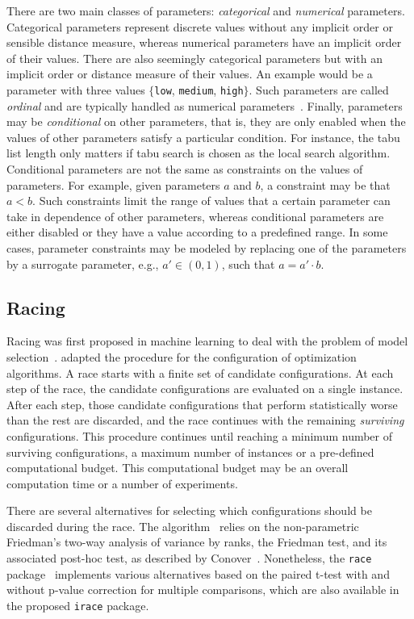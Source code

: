 \documentclass[a4paper]{article}
\newcommand{\eg}{e.g.}%
\newcommand{\FRACE}{\text{F-Race}\xspace}
\begin{document}
There are two main classes of  parameters:
\emph{categorical} and \emph{numerical} parameters. Categorical
parameters represent discrete values without any implicit order or
sensible distance measure, whereas numerical parameters have an
implicit order of their values. There are also seemingly categorical
parameters but with an implicit order or distance measure of their
values. An example would be a parameter with three values
$\{$\texttt{low}, \texttt{medium}, \texttt{high}$\}$. Such parameters
are called \emph{ordinal} and are typically handled as numerical
parameters~\citep{BirYuaBal2010:emaoa}. Finally, parameters may be
\emph{conditional} on other parameters, that is, they are only enabled
when the values of other parameters satisfy a particular
condition. For instance, the tabu list length only matters if tabu search is chosen as the local search algorithm. Conditional parameters are not the same as
constraints on the values of parameters.  For example, given
parameters $a$ and $b$, a constraint may be that $a < b$. Such
constraints limit the range of values that a certain parameter can
take in dependence of other parameters, whereas conditional parameters
are either disabled or they have a value according to a predefined
range. In some cases, parameter constraints may be modeled by
replacing one of the parameters by a surrogate parameter, \eg{}, $a'
\in (0,1)$, such that $ a = a' \cdot b$.


\subsection{Racing}

Racing was first proposed in machine learning to deal with the problem
of model selection~\citep{MarMoo1997air}. 
\citet{Birattari09tuning} adapted the procedure for the configuration
of optimization algorithms. A race starts with a finite set of
candidate configurations. At each step of the race, the candidate
configurations are evaluated on a single instance. After each step,
those candidate configurations that perform statistically worse than
the rest are discarded, and the race continues with the remaining
\emph{surviving} configurations. This procedure continues until
reaching a minimum number of surviving configurations, a maximum
number of instances or a pre-defined computational budget. This
computational budget may be an overall computation time or a number of
experiments.

There are several alternatives for selecting which configurations
should be discarded during the race. The \FRACE
algorithm~\citep{Birattari09tuning,BirStuPaqVar02:gecco} relies on the
non-parametric Friedman's two-way analysis of variance by ranks, the
Friedman test, and its associated post-hoc test, as described by
Conover~\citep{Conover99:pns}. Nonetheless, the \texttt{race}
package~\citep{IRIDIA-2003-037} implements various alternatives based
on the paired t-test with and without p-value correction for multiple
comparisons, which are also available in the proposed \texttt{irace}
package.
\end{document}
